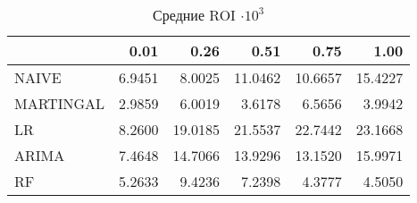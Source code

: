 \begin{table}[h]
\caption{Средние ROI $\cdot 10^3$}
\label{tab:roi_mean}
\begin{tabular}{lrrrrr}
\toprule
 &  0.01 &  0.26 &  0.51 &  0.75 &  1.00 \\
\midrule
NAIVE & 6.9451 & 8.0025 & 11.0462 & 10.6657 & 15.4227 \\
MARTINGAL & 2.9859 & 6.0019 & 3.6178 & 6.5656 & 3.9942 \\
LR & 8.2600 & 19.0185 & 21.5537 & 22.7442 & 23.1668 \\
ARIMA & 7.4648 & 14.7066 & 13.9296 & 13.1520 & 15.9971 \\
RF & 5.2633 & 9.4236 & 7.2398 & 4.3777 & 4.5050 \\
\bottomrule
\end{tabular}
\end{table}
